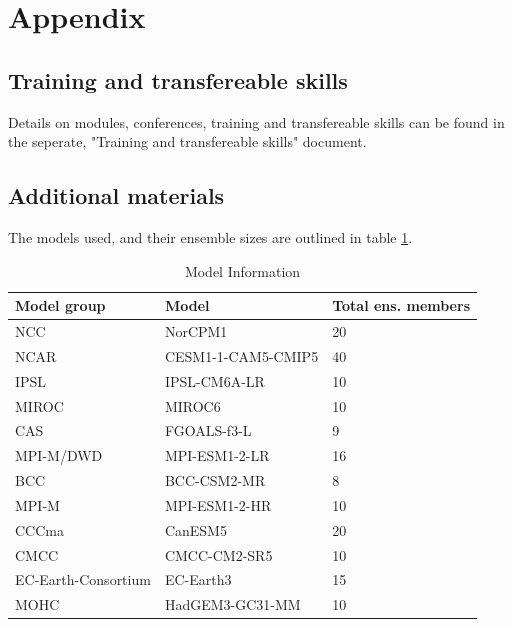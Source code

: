 \documentclass{article}
\begin{document}
\printbibliography

\section*{Appendix}

\subsection*{Training and transfereable skills}

Details on modules, conferences, training and transfereable skills can be found in the seperate, "Training and transfereable skills" document.

\subsection*{Additional materials}

The models used, and their ensemble sizes are outlined in table \ref{tab:models}.

\begin{table}[ht]
    \centering
    \caption{Model Information}
    \begin{tabular}{lll}
        \toprule
        Model group & Model & Total ens. members \\
        \midrule
        NCC & NorCPM1 & 20 \\
        NCAR & CESM1-1-CAM5-CMIP5 & 40 \\
        IPSL & IPSL-CM6A-LR & 10 \\
        MIROC & MIROC6 & 10 \\
        CAS & FGOALS-f3-L & 9 \\
        MPI-M/DWD & MPI-ESM1-2-LR & 16 \\
        BCC & BCC-CSM2-MR & 8 \\
        MPI-M & MPI-ESM1-2-HR & 10 \\
        CCCma & CanESM5 & 20 \\
        CMCC & CMCC-CM2-SR5 & 10 \\
        EC-Earth-Consortium & EC-Earth3 & 15 \\
        MOHC & HadGEM3-GC31-MM & 10 \\
        \bottomrule
    \end{tabular}
    \label{tab:models}
\end{table}
\end{document}
